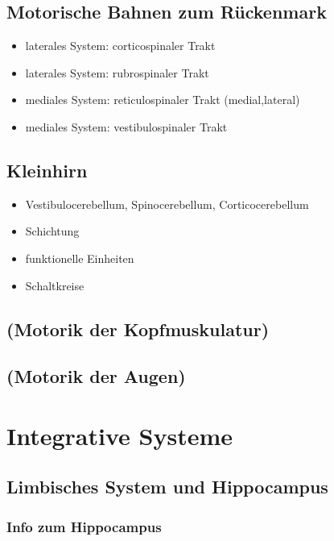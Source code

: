 \documentclass[12pt,a4paper,pdftex]{article}
\begin{document}
\subsection{Motorische Bahnen zum Rückenmark}
\begin{itemize}
    \item laterales System: corticospinaler Trakt
    \item laterales System: rubrospinaler Trakt
    \item mediales System: reticulospinaler Trakt (medial,lateral)
    \item mediales System: vestibulospinaler Trakt
\end{itemize}
\subsection{Kleinhirn}
\begin{itemize}
    \item Vestibulocerebellum, Spinocerebellum, Corticocerebellum 
    \item Schichtung
    \item funktionelle Einheiten
    \item Schaltkreise
\end{itemize}
\subsection{(Motorik der Kopfmuskulatur)}
\subsection{(Motorik der Augen)}

\newpage
\section{Integrative Systeme}
\subsection{Limbisches System und Hippocampus}

\subsubsection*{Info zum Hippocampus}
\end{document}

